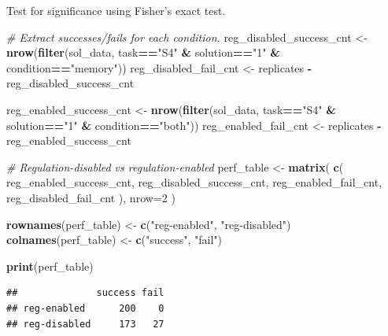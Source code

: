 \documentclass[
]{book}
\newenvironment{Shaded}{\begin{snugshade}}{\end{snugshade}}
\newcommand{\CommentTok}[1]{\textcolor[rgb]{0.56,0.35,0.01}{\textit{#1}}}
\newcommand{\DataTypeTok}[1]{\textcolor[rgb]{0.13,0.29,0.53}{#1}}
\newcommand{\DecValTok}[1]{\textcolor[rgb]{0.00,0.00,0.81}{#1}}
\newcommand{\KeywordTok}[1]{\textcolor[rgb]{0.13,0.29,0.53}{\textbf{#1}}}
\newcommand{\NormalTok}[1]{#1}
\newcommand{\OperatorTok}[1]{\textcolor[rgb]{0.81,0.36,0.00}{\textbf{#1}}}
\newcommand{\StringTok}[1]{\textcolor[rgb]{0.31,0.60,0.02}{#1}}
\begin{document}
Test for significance using Fisher's exact test.

\begin{Shaded}
\begin{Highlighting}[]
\CommentTok{\# Extract successes/fails for each condition.}
\NormalTok{reg\_disabled\_success\_cnt \textless{}{-}}\StringTok{ }\KeywordTok{nrow}\NormalTok{(}\KeywordTok{filter}\NormalTok{(sol\_data, task}\OperatorTok{==}\StringTok{"S4"} \OperatorTok{\&}\StringTok{ }\NormalTok{solution}\OperatorTok{==}\StringTok{"1"} \OperatorTok{\&}\StringTok{ }\NormalTok{condition}\OperatorTok{==}\StringTok{"memory"}\NormalTok{))}
\NormalTok{reg\_disabled\_fail\_cnt \textless{}{-}}\StringTok{ }\NormalTok{replicates }\OperatorTok{{-}}\StringTok{ }\NormalTok{reg\_disabled\_success\_cnt}

\NormalTok{reg\_enabled\_success\_cnt \textless{}{-}}\StringTok{ }\KeywordTok{nrow}\NormalTok{(}\KeywordTok{filter}\NormalTok{(sol\_data, task}\OperatorTok{==}\StringTok{"S4"} \OperatorTok{\&}\StringTok{ }\NormalTok{solution}\OperatorTok{==}\StringTok{"1"} \OperatorTok{\&}\StringTok{ }\NormalTok{condition}\OperatorTok{==}\StringTok{"both"}\NormalTok{))}
\NormalTok{reg\_enabled\_fail\_cnt \textless{}{-}}\StringTok{ }\NormalTok{replicates }\OperatorTok{{-}}\StringTok{ }\NormalTok{reg\_enabled\_success\_cnt}

\CommentTok{\# Regulation{-}disabled vs regulation{-}enabled}
\NormalTok{perf\_table \textless{}{-}}\StringTok{ }\KeywordTok{matrix}\NormalTok{(}
  \KeywordTok{c}\NormalTok{(}
\NormalTok{    reg\_enabled\_success\_cnt,}
\NormalTok{    reg\_disabled\_success\_cnt,}
\NormalTok{    reg\_enabled\_fail\_cnt,}
\NormalTok{    reg\_disabled\_fail\_cnt}
\NormalTok{    ),}
    \DataTypeTok{nrow=}\DecValTok{2}
\NormalTok{)}

\KeywordTok{rownames}\NormalTok{(perf\_table) \textless{}{-}}\StringTok{ }\KeywordTok{c}\NormalTok{(}\StringTok{"reg{-}enabled"}\NormalTok{, }\StringTok{"reg{-}disabled"}\NormalTok{)}
\KeywordTok{colnames}\NormalTok{(perf\_table) \textless{}{-}}\StringTok{ }\KeywordTok{c}\NormalTok{(}\StringTok{"success"}\NormalTok{, }\StringTok{"fail"}\NormalTok{)}

\KeywordTok{print}\NormalTok{(perf\_table)}
\end{Highlighting}
\end{Shaded}

\begin{verbatim}
##              success fail
## reg-enabled      200    0
## reg-disabled     173   27
\end{verbatim}
\end{document}
